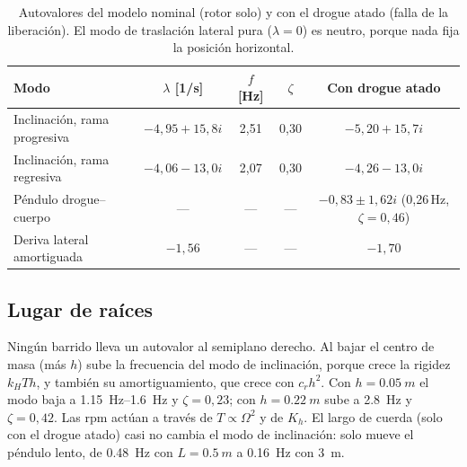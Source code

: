 \begin{table}[H]
\centering\small
\caption{Autovalores del modelo nominal (rotor solo) y con el drogue atado (falla de la
liberación). El modo de traslación lateral pura ($\lambda=0$) es neutro, porque nada fija
la posición horizontal.}
\label{tab:estabilidad-modos}
\begin{tabular}{@{}lcccc@{}}
\toprule
Modo & $\lambda$ [1/s] & $f$ [Hz] & $\zeta$ & Con drogue atado\\\midrule
Inclinación, rama progresiva & $-4{,}95+15{,}8i$ & 2,51 & 0,30 & $-5{,}20+15{,}7i$\\
Inclinación, rama regresiva  & $-4{,}06-13{,}0i$ & 2,07 & 0,30 & $-4{,}26-13{,}0i$\\
Péndulo drogue--cuerpo       & --- & --- & --- & $-0{,}83\pm1{,}62i$ (0,26\,Hz, $\zeta=0{,}46$)\\
Deriva lateral amortiguada   & $-1{,}56$ & --- & --- & $-1{,}70$\\
\bottomrule
\end{tabular}
\end{table}

\subsection{Lugar de raíces}
Ningún barrido lleva un autovalor al semiplano derecho. Al bajar el centro de masa (más
$h$) sube la frecuencia del modo de inclinación, porque crece la rigidez $k_HTh$, y
también su amortiguamiento, que crece con $c_rh^2$. Con $h=\SI{0.05}{m}$ el modo baja a \SIrange{1.15}{1.6}{Hz} y $\zeta=0{,}23$; con
$h=\SI{0.22}{m}$ sube a \SI{2.8}{Hz} y $\zeta=0{,}42$. Las rpm actúan a través de
$T\propto\Omega^2$ y de $K_h$. El largo de cuerda (solo con el drogue atado) casi no
cambia el modo de inclinación: solo mueve el péndulo lento, de \SI{0.48}{Hz} con
$L=\SI{0.5}{m}$ a \SI{0.16}{Hz} con \SI{3}{m}.

